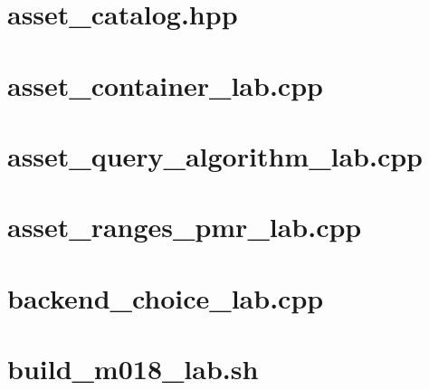 \documentclass[11pt,twoside,openany]{book}
\begin{document}
\section*{asset\_catalog.hpp}
\hypertarget{source-file-e829cf731b17419e282775cf}{}
\label{attachmentstart:source-file-e829cf731b17419e282775cf}
\section*{asset\_container\_lab.cpp}
\hypertarget{source-file-c479bd493444d093f6c34898}{}
\label{attachmentstart:source-file-c479bd493444d093f6c34898}
\section*{asset\_query\_algorithm\_lab.cpp}
\hypertarget{source-file-a1c76c44bc377537c732f5c4}{}
\label{attachmentstart:source-file-a1c76c44bc377537c732f5c4}
\section*{asset\_ranges\_pmr\_lab.cpp}
\hypertarget{source-file-9e5ff4ba88e6efabc938832a}{}
\label{attachmentstart:source-file-9e5ff4ba88e6efabc938832a}
\section*{backend\_choice\_lab.cpp}
\hypertarget{source-file-c936569afa19be638ec87991}{}
\label{attachmentstart:source-file-c936569afa19be638ec87991}
\section*{build\_m018\_lab.sh}
\hypertarget{source-file-e1b7c3e4f52da0e7c9c36a41}{}
\label{attachmentstart:source-file-e1b7c3e4f52da0e7c9c36a41}
\end{document}
